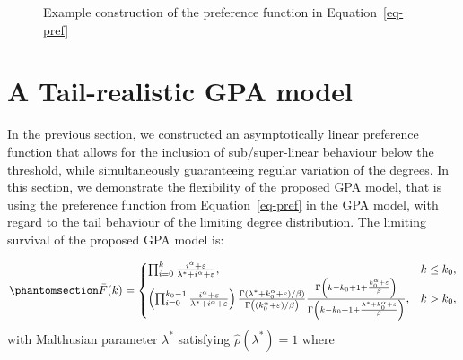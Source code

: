 \documentclass[
  sn-basic,
  10pt,
]{sn-jnl}
\theoremstyle{thmstyleone}
\theoremstyle{thmstyleone}
\theoremstyle{remark}
\theoremstyle{plain}
\theoremstyle{plain}
\theoremstyle{remark}
\begin{document}
\begin{figure}


\caption{\label{fig-ex}Example construction of the preference function
in Equation~\ref{eq-pref}}

\end{figure}%

\newpage

\section{A Tail-realistic GPA model}\label{sec-model}

In the previous section, we constructed an asymptotically linear
preference function that allows for the inclusion of sub/super-linear
behaviour below the threshold, while simultaneously guaranteeing regular
variation of the degrees. In this section, we demonstrate the
flexibility of the proposed GPA model, that is using the preference
function from Equation~\ref{eq-pref} in the GPA model, with regard to
the tail behaviour of the limiting degree distribution. The limiting
survival of the proposed GPA model is:

\begin{equation}\phantomsection\label{eq-polysurv}{
\bar F(k) = \begin{cases}
\prod_{i=0}^{k}\frac{i^\alpha + \varepsilon}{\lambda^*+i^\alpha + \varepsilon},&k\le k_0,\\
\left(\prod_{i=0}^{k_0-1}\frac{i^\alpha + \varepsilon}{\lambda^*+i^\alpha + \varepsilon}\right)\frac{\Gamma(\lambda^*+k_0^\alpha + \varepsilon)/\beta)}{\Gamma\left((k_0^\alpha + \varepsilon)/\beta\right)} \frac{\Gamma\left(k-k_0 + 1 +\frac{k_0^\alpha + \varepsilon}{\beta}\right)}{\Gamma\left(k-k_0 + 1 +\frac{\lambda^* +k_0^\alpha + \varepsilon}{\beta}\right)},&k > k_0,
\end{cases}
}\end{equation} with Malthusian parameter \(\lambda^*\) satisfying
\(\hat \rho(\lambda^*)=1\) where
\end{document}
